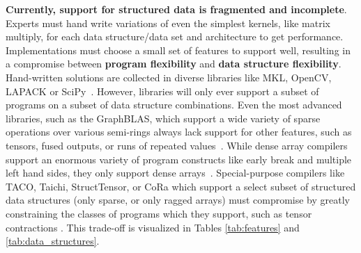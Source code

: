 %
\textbf{Currently, support for structured data is fragmented and incomplete}.
%
Experts must hand write variations of even the simplest kernels, like matrix
multiply, for each data structure/data set and architecture to get performance.
%
Implementations must choose a small set of features to support well, resulting
in a compromise between \textbf{program flexibility} and \textbf{data structure
flexibility}.
%
Hand-written solutions are collected in diverse libraries like
MKL, OpenCV, LAPACK or SciPy~\cite{ bradski2000opencv, anderson1999lapack, virtanen2020scipy, psarras2022linear}. 
%
However, libraries will only ever support a subset of
programs on a subset of data structure combinations.
%
Even the most advanced
libraries, such as the GraphBLAS, which support a wide variety of sparse
operations over various semi-rings always lack support for other features, such
as tensors, fused outputs, or runs of repeated values~\cite{bulucc2017design, mattson2019lagraph}.
%
While dense array
compilers support an enormous variety of program constructs like early break and
multiple left hand sides, they only support dense arrays~\cite{ragan-kelley_halide_2013,grosser2012polly}.  
%
Special-purpose
compilers like TACO, Taichi, StructTensor, or CoRa which support a select subset of structured data
structures (only sparse, or only ragged arrays) must compromise by greatly
constraining the classes of programs which they support, such as tensor
contractions \cite{kjolstad_tensor_2019, hu_taichi_2019, ghorbani2023compiling, fegade_cora_2022}. 
%
This trade-off is visualized in Tables \ref{tab:features} and \ref{tab:data_structures}.
%

\newcommand*\rot{\rotatebox{90}}

